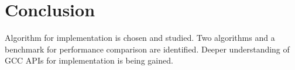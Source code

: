 \chapter{Conclusion}

Algorithm for implementation is chosen and studied. Two algorithms and a benchmark for performance comparison are identified. Deeper understanding of GCC APIs for implementation is being gained.
